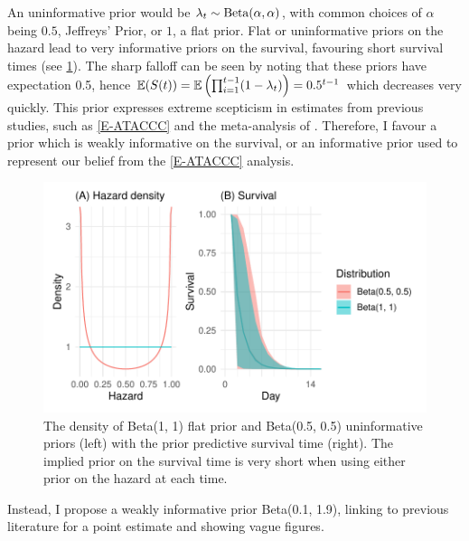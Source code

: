 \documentclass[thesis.tex]{subfiles}
\begin{document}
An uninformative prior would be $\lambda_t \sim \operatorname{Beta}(\alpha, \alpha)$, with common choices of $\alpha$ being $0.5$, Jeffreys' Prior, or $1$, a flat prior.
Flat or uninformative priors on the hazard lead to very informative priors on the survival, favouring short survival times (see \cref{perf-test:fig:flat-prior}).
The sharp falloff can be seen by noting that these priors have expectation 0.5, hence $\operatorname{\mathbb{E}}(S(t)) = \operatorname{\mathbb{E}} \left( \prod_{i=1}^{t-1} (1-\lambda_t) \right) = 0.5^{t-1}$ which decreases very quickly.
This prior expresses extreme scepticism in estimates from previous studies, such as \cref{E-ATACCC} and the meta-analysis of \textcite{cevikShedding}.
Therefore, I favour a prior which is weakly informative on the survival, or an informative prior used to represent our belief from the \cref{E-ATACCC} analysis.
\begin{figure}
  \centering \includegraphics{cis-perfect-testing/flat-prior}
  \caption[Uninformative priors for the hazard]{The density of Beta(1, 1) flat prior and Beta(0.5, 0.5) uninformative priors (left) with the prior predictive survival time (right). The implied prior on the survival time is very short when using either prior on the hazard at each time. \label{perf-test:fig:flat-prior}}
\end{figure}

Instead, I propose a weakly informative prior Beta(0.1, 1.9), linking to previous literature for a point estimate and showing vague figures.
\end{document}

